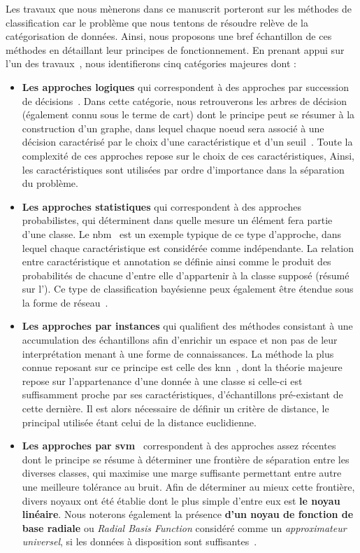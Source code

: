 Les travaux que nous mènerons dans ce manuscrit porteront sur les méthodes de classification car le problème que nous tentons de résoudre relève de la catégorisation de données. Ainsi, nous proposons une bref échantillon de ces méthodes en détaillant leur principes de fonctionnement. En prenant appui sur l'un des travaux~\cite{Kotsiantis2007}, nous identifierons cinq catégories majeures dont :
\begin{itemize}
    \item \textbf{Les approches logiques} qui correspondent à des approches par succession de décisions~\cite{Kotsiantis2007}. Dans cette catégorie, nous retrouverons les arbres de décision~\cite{Breiman1984} (également connu sous le terme de \gls{cart}) dont le principe peut se résumer à la construction d'un graphe, dans lequel chaque noeud sera associé à une décision caractérisé par le choix d'une caractéristique et d'un seuil~\cite{Quinlan1986}. Toute la complexité de ces approches repose sur le choix de ces caractéristiques, Ainsi, les caractéristiques sont utilisées par ordre d'importance dans la séparation du problème.
    \item \textbf{Les approches statistiques} qui correspondent à des approches probabilistes, qui déterminent dans quelle mesure un élément fera partie d'une classe. Le \gls{nbm}~\cite{Zhang2004} est un exemple typique de ce type d'approche, dans lequel chaque caractéristique est considérée comme indépendante. La relation entre caractéristique et annotation se définie ainsi comme le produit des probabilités de chacune d'entre elle d'appartenir à la classe supposé (résumé sur l'). Ce type de classification bayésienne peux également être étendue sous la forme de réseau~\cite{Kononenko1989}.
    \item \textbf{Les approches par instances} qui qualifient des méthodes consistant à une accumulation des échantillons afin d'enrichir un espace et non pas de leur interprétation menant à une forme de connaissances. La méthode la plus connue reposant sur ce principe est celle des \gls{knn}~\cite{Cover1967}, dont la théorie majeure repose sur l'appartenance d'une donnée à une classe si celle-ci est suffisamment proche par ses caractéristiques, d'échantillons pré-existant de cette dernière. Il est alors nécessaire de définir un critère de distance, le principal utilisée étant  celui de la distance euclidienne. 
    \item \textbf{Les approches par \gls{svm}}~\cite{Cortes1995} correspondent à des approches assez récentes dont le principe se résume à déterminer une frontière de séparation entre les diverses classes, qui maximise une marge suffisante permettant entre autre une meilleure tolérance au bruit. Afin de déterminer au mieux cette frontière, divers noyaux ont été établie dont le plus simple d'entre eux est \textbf{le noyau linéaire}. Nous noterons également la présence \textbf{d'un noyau de fonction de base radiale} ou \textit{Radial Basis Function} considéré comme un \textit{approximateur universel}, si les données à disposition sont suffisantes~\cite{Wang2004}.  

\end{itemize}
